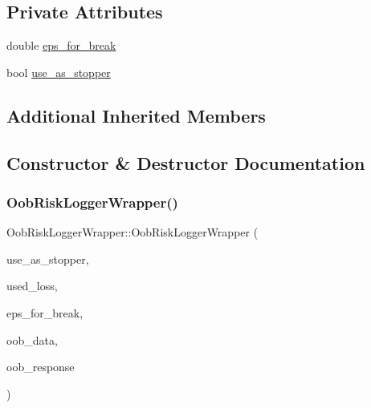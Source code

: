\subsection*{Private Attributes}
\begin{DoxyCompactItemize}
\item 
double \mbox{\hyperlink{class_oob_risk_logger_wrapper_a7c19b01e8cb0edebad436ed8546f5016}{eps\+\_\+for\+\_\+break}}
\item 
bool \mbox{\hyperlink{class_oob_risk_logger_wrapper_ab44c7c7c68e6710aededb230254d468a}{use\+\_\+as\+\_\+stopper}}
\end{DoxyCompactItemize}
\subsection*{Additional Inherited Members}


\subsection{Constructor \& Destructor Documentation}
\mbox{\label{class_oob_risk_logger_wrapper_a5d5aabfad52c12922c892a3ddf29c2d4}} 
\subsubsection{\texorpdfstring{Oob\+Risk\+Logger\+Wrapper()}{OobRiskLoggerWrapper()}}
{\footnotesize\ttfamily Oob\+Risk\+Logger\+Wrapper\+::\+Oob\+Risk\+Logger\+Wrapper (\begin{DoxyParamCaption}\item[{bool}]{use\+\_\+as\+\_\+stopper,  }\item[{\mbox{\hyperlink{class_loss_wrapper}{Loss\+Wrapper}} \&}]{used\+\_\+loss,  }\item[{double}]{eps\+\_\+for\+\_\+break,  }\item[{Rcpp\+::\+List}]{oob\+\_\+data,  }\item[{arma\+::vec}]{oob\+\_\+response }\end{DoxyParamCaption})\hspace{0.3cm}{\ttfamily [inline]}}

